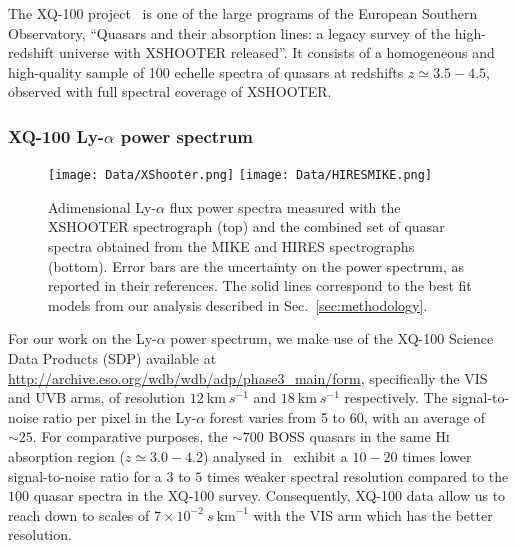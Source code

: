 The XQ-100 project~\citep{XQ100} is one of the large programs of the European Southern Observatory, ``Quasars and their absorption lines: a legacy survey of the high-redshift universe with XSHOOTER released''. It consists of a homogeneous and high-quality sample of 100 echelle spectra of quasars at redshifts $z \simeq 3.5-4.5$,  observed with full spectral coverage of XSHOOTER. 


\subsubsection{XQ-100 Ly-$\alpha$ power spectrum}

\begin{figure}[!]
\begin{center}
\texttt{[image: Data/XShooter.png]}
\texttt{[image: Data/HIRESMIKE.png]}
\caption{Adimensional Ly-$\alpha$ flux power spectra measured with the XSHOOTER spectrograph (top) and the combined set of quasar spectra obtained from the MIKE and HIRES spectrographs (bottom). Error bars are the uncertainty on the power spectrum, as reported in their references. The solid lines correspond to the best fit models from our analysis described in Sec.~\ref{sec:methodology}.}
\label{fig:hr_mr}
\end{center}
\end{figure}

For our work on the Ly-$\alpha$ power spectrum, we make use of the XQ-100 Science Data Products (SDP) available at \url{http://archive.eso.org/wdb/wdb/adp/phase3_main/form}, specifically the VIS and UVB arms, of resolution $12~\mathrm{km}~s^{-1}$ and  $18~\mathrm{km}~s^{-1}$ respectively.  The signal-to-noise ratio per pixel in the Ly-$\alpha$ forest varies from 5 to 60, with an average of $\sim 25$. For comparative purposes, the $\sim 700$ BOSS quasars in the same \textsc{Hi} absorption region ($z \simeq 3.0-4.2$) analysed in~\cite{Palanque-Delabrouille2013} exhibit a $10-20$ times lower signal-to-noise ratio for a $3$ to $5$ times weaker spectral resolution compared to the $100$ quasar spectra in the XQ-100 survey.  Consequently, XQ-100 data allow us to reach down to scales of $7 \times 10^{-2}~s~\mathrm{km}^{-1}$ with the VIS arm which has the better resolution.\\

